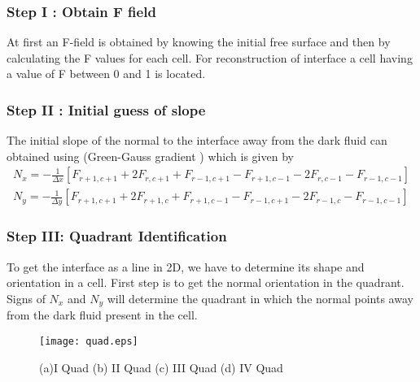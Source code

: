 \subsubsection{Step I : Obtain F field}
At first an F-field is obtained by knowing the initial free surface and then by calculating the F values for each cell. 
For reconstruction of interface a cell having a value of F between 0 and 1 is located.

\subsubsection{Step II : Initial guess of slope}
The initial slope of the normal to the interface away from the dark fluid can obtained using (Green-Gauss gradient \cite{Gerlach2006}) which is  given by 
\begin{eqnarray}
  N_x=-\frac{1}{\Delta x}{[F_{r+1,c+1}+2F_{r,c+1}+F_{r-1,c+1}-F_{r+1,c-1}-2F_{r,c-1}-F_{r-1,c-1}]} \\
  N_y=-\frac{1}{\Delta y}{[F_{r+1,c+1}+2F_{r+1,c}+F_{r+1,c-1}-F_{r-1,c+1}-2F_{r-1,c}-F_{r-1,c-1}]}
  \label{Eq:GG}
\end{eqnarray}

\subsubsection{Step III: Quadrant Identification}
To get the interface as a line in 2D, we have to determine its shape and orientation in a cell. First step is to get the normal orientation in the quadrant.
 Signs of $N_x$ and $N_y$ will determine the quadrant in which the normal points away from the dark fluid present in the cell. 
  \begin{figure}%
  \centering
   \texttt{[image: quad.eps]}
   \caption[Interface normal direction]{(a)I Quad (b) II Quad (c) III Quad (d) IV Quad }
   \label{Fig:quad}
  \end{figure}

